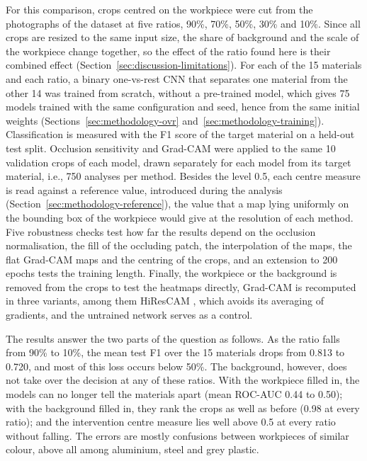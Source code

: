 For this comparison, crops centred on the workpiece were cut from the photographs of the
dataset at five ratios, 90\%, 70\%, 50\%, 30\% and 10\%. Since all crops are resized to
the same input size, the share of background and the scale of the workpiece change
together, so the effect of the ratio found here is their combined effect
(Section~\ref{sec:discussion-limitations}). For each of the 15 materials and each ratio,
a binary one-vs-rest CNN that separates one material from the other 14 was trained from
scratch, without a pre-trained model, which gives 75 models trained with the same
configuration and seed, hence from the same initial weights (Sections~\ref{sec:methodology-ovr}
and~\ref{sec:methodology-training}). Classification is
measured with the F1 score of the target material on a held-out test split. Occlusion
sensitivity and Grad-CAM were applied to the same 10 validation crops of each model,
drawn separately for each model from its target material, i.e., 750 analyses per
method. Besides the level 0.5, each centre measure is read
against a reference value, introduced during the analysis
(Section~\ref{sec:methodology-reference}), the value that a map lying uniformly on the bounding box of
the workpiece would give at the resolution of each method. Five robustness checks test
how far the results depend on the occlusion normalisation, the fill of the occluding
patch, the interpolation of the maps, the flat Grad-CAM maps and the centring of the
crops, and an extension to 200 epochs tests the training length. Finally, the workpiece
or the background is removed from the crops to test the heatmaps directly, Grad-CAM is
recomputed in three variants, among them HiResCAM \citep{draelos2021hirescam}, which
avoids its averaging of gradients, and the untrained network serves as a control.

The results answer the two parts of the question as follows. As the ratio falls from
90\% to 10\%, the mean test F1 over the 15 materials drops from 0.813 to 0.720, and most
of this loss occurs below 50\%. The background, however, does not take over the
decision at any of these ratios. With the workpiece filled in, the models can no longer
tell the materials apart (mean ROC-AUC 0.44 to 0.50); with the background filled in,
they rank the crops as well as before (0.98 at every ratio); and the intervention centre
measure lies well above 0.5 at every ratio without falling. The errors are mostly
confusions between workpieces of similar colour, above all among aluminium, steel and
grey plastic.

